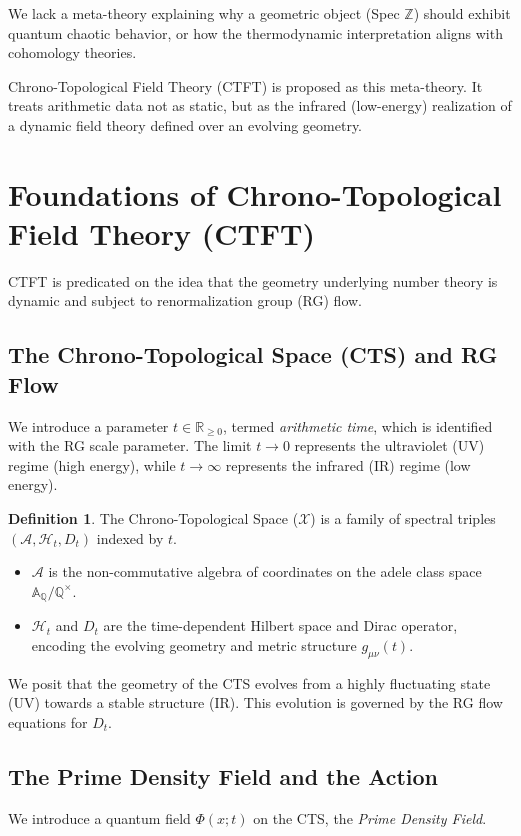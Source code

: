\documentclass[11pt, a4paper]{article}
\theoremstyle{definition}
\newtheorem{definition}{Definition}[section]
\newcommand{\Z}{\mathbb{Z}}
\newcommand{\Q}{\mathbb{Q}}
\newcommand{\R}{\mathbb{R}}
\newcommand{\A}{\mathbb{A}}
\newcommand{\CTS}{\mathcal{X}}
\newcommand{\Hilb}{\mathcal{H}}
\newcommand{\Alg}{\mathscr{A}}
\begin{document}
We lack a meta-theory explaining why a geometric object (Spec $\Z$) should exhibit quantum chaotic behavior, or how the thermodynamic interpretation aligns with cohomology theories.

Chrono-Topological Field Theory (CTFT) is proposed as this meta-theory. It treats arithmetic data not as static, but as the infrared (low-energy) realization of a dynamic field theory defined over an evolving geometry.

\section{Foundations of Chrono-Topological Field Theory (CTFT)}
CTFT is predicated on the idea that the geometry underlying number theory is dynamic and subject to renormalization group (RG) flow.

\subsection{The Chrono-Topological Space (CTS) and RG Flow}
We introduce a parameter $t \in \R_{\geq 0}$, termed \textit{arithmetic time}, which is identified with the RG scale parameter. The limit $t\to 0$ represents the ultraviolet (UV) regime (high energy), while $t\to\infty$ represents the infrared (IR) regime (low energy).

\begin{definition}
The Chrono-Topological Space ($\CTS$) is a family of spectral triples $(\Alg, \Hilb_t, D_t)$ indexed by $t$.
\begin{itemize}
    \item $\Alg$ is the non-commutative algebra of coordinates on the adele class space $\A_\Q/\Q^\times$.
    \item $\Hilb_t$ and $D_t$ are the time-dependent Hilbert space and Dirac operator, encoding the evolving geometry and metric structure $g_{\mu\nu}(t)$.
\end{itemize}
\end{definition}

We posit that the geometry of the CTS evolves from a highly fluctuating state (UV) towards a stable structure (IR). This evolution is governed by the RG flow equations for $D_t$.

\subsection{The Prime Density Field and the Action}
We introduce a quantum field $\Phi(x; t)$ on the CTS, the \textit{Prime Density Field}.
\end{document}

